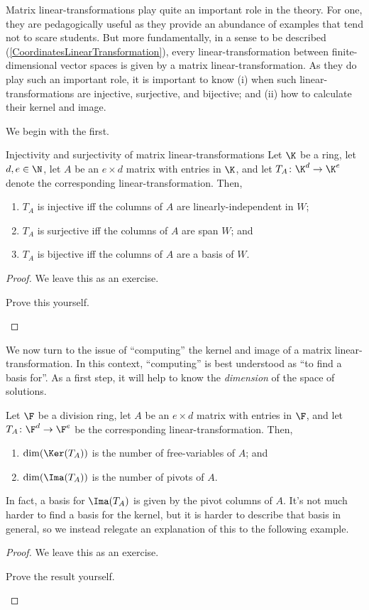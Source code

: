 Matrix linear-transformations play quite an important role in the theory.  For one, they are pedagogically useful as they provide an abundance of examples that tend not to scare students.  But more fundamentally, in a sense to be described (\cref{CoordinatesLinearTransformation}), every linear-transformation between finite-dimensional vector spaces is given by a matrix linear-transformation.  As they do play such an important role, it is important to know (i) when such linear-transformations are injective, surjective, and bijective; and (ii) how to calculate their kernel and image.

We begin with the first.
\begin{prp}{Injectivity and surjectivity of matrix linear-transformations}{}
	Let $\K$ be a ring, let $d,e\in \N$, let $A$ be an $e\times d$ matrix with entries in $\K$, and let $T_A\colon \K ^d\rightarrow \K ^e$ denote the corresponding linear-transformation.  Then,
	\begin{enumerate}
		\item $T_A$ is injective iff the columns of $A$ are linearly-independent in $W$;
		\item $T_A$ is surjective iff the columns of $A$ are span $W$; and
		\item $T_A$ is bijective iff the columns of $A$ are a basis of $W$.
	\end{enumerate}
	\begin{proof}
		We leave this as an exercise.
		\begin{exr}[breakable=false]{}{}
			Prove this yourself.
		\end{exr}
	\end{proof}
\end{prp}
We now turn to the issue of ``computing'' the kernel and image of a matrix linear-transformation.  In this context, ``computing'' is best understood as ``to find a basis for''.  As a first step, it will help to know the \emph{dimension} of the space of solutions.
\begin{prp}{}{}
	Let $\F$ be a division ring, let $A$ be an $e\times d$ matrix with entries in $\F$, and let $T_A\colon \F ^d\rightarrow \F ^e$ be the corresponding linear-transformation.  Then,
	\begin{enumerate}
		\item $\dim (\Ker (T_A))$ is the number of free-variables of $A$; and
		\item $\dim (\Ima (T_A))$ is the number of pivots of $A$.
	\end{enumerate}
	\begin{rmk}
		In fact, a basis for $\Ima (T_A)$ is given by the pivot columns of $A$.  It's not much harder to find a basis for the kernel, but it is harder to describe that basis in general, so we instead relegate an explanation of this to the following example.
	\end{rmk}
	\begin{proof}
		We leave this as an exercise.
		\begin{exr}[breakable=false]{}{}
			Prove the result yourself.
		\end{exr}
	\end{proof}
\end{prp}
